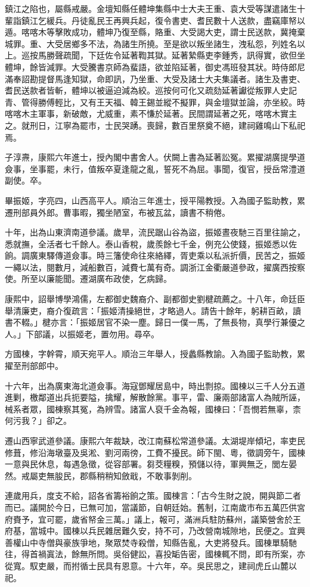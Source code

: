 \begin{pinyinscope}
鎮江之陷也，屬縣戒嚴。金壇知縣任體坤集縣中士大夫王重、袁大受等謀遣諸生十輩詣鎮江乞緩兵。丹徒亂民王再興兵起，復令書吏、耆民數十人送款，盡竊庫帑以遁。喀喀木等擊敗成功，體坤乃復至縣，賂重、大受謁大吏，謂士民送款，冀掩棄城罪。重、大受居鄉多不法，為諸生所撓。至是欲以叛坐諸生，洩私怨，列姓名以上。巡按馬勝聲疏聞，下廷佐令延著鞫其獄。延著縶縣吏李鍾秀，訊得實，欲但坐體坤，餘皆減罪。大受騰書京師為蜚語，欲並陷延著，御史馮班發其狀。時侍郎尼滿奉詔勘提督馬逢知獄，命即訊，乃坐重、大受及諸士大夫集議者。諸生及書吏、耆民送款者皆斬，體坤以被逼迫減為絞。巡按何可化又疏劾延著讞從叛罪人史記青、管得勝傅輕比，又有王天福、韓王錫並縱不擬罪，與金壇獄並論，亦坐絞。時喀喀木主軍事，新破敵，尤威重，素不慊於延著。民間謂延著之死，喀喀木實主之。就刑日，江寧為罷市，士民哭踴。喪歸，數百里祭奠不絕，建祠雞鳴山下私祀焉。

子淳燾，康熙六年進士，授內閣中書舍人。伏闕上書為延著訟冤。累擢湖廣提學道僉事，坐事罷，未行，值叛卒夏逢龍之亂，誓死不為屈。事聞，復官，授岳常澧道副使。卒。

畢振姬，字亮四，山西高平人。順治三年進士，授平陽教授。入為國子監助教，累遷刑部員外郎。曹事暇，獨坐陋室，布被瓦盆，讀書不稍倦。

十年，出為山東濟南道參議。歲旱，流民踞山谷為盜，振姬晝夜馳三百里往諭之，悉就撫，全活者七千餘人。泰山香稅，歲羨餘七千金，例充公使錢，振姬悉以佐餉。調廣東驛傳道僉事。時三籓使命往來絡繹，胥吏乘以私派折價，民苦之，振姬一繩以法，閱數月，減船數百，減費七萬有奇。調浙江金衢嚴道參政，擢廣西按察使。所至以廉能聞。遷湖廣布政使，乞病歸。

康熙中，詔舉博學鴻儒，左都御史魏裔介、副都御史劉楗疏薦之。十八年，命廷臣舉清廉吏，裔介復疏言：「振姬清操絕世，才略過人。請告十餘年，躬耕百畝，讀書不輟。」楗亦言：「振姬居官不染一塵。歸日一僕一馬，了無長物，真學行兼優之人。」下部議，以振姬老，置勿用。尋卒。

方國棟，字幹霄，順天宛平人。順治三年舉人，授蠡縣教諭。入為國子監助教，累擢至刑部郎中。

十六年，出為廣東海北道僉事。海寇鄧耀居島中，時出剽掠。國棟以三千人分五道進剿，檄鄰道出兵扼要隘，擒耀，解散餘黨。事平，雷、廉兩部諸富人為賊所誣，械系者眾，國棟察其冤，為辨雪。諸富人裒千金為報，國棟曰：「吾憫若無辜，柰何污我？」卻之。

遷山西寧武道參議。康熙六年裁缺，改江南蘇松常道參議。太湖堤岸傾圮，率吏民修葺，修沿海墩臺及吳淞、劉河兩徬，工費不擾民。師下閩、粵，徵調旁午，國棟一意與民休息，每遇急徵，從容部署。芻茭糧糗，預儲以待，軍興無乏，閭左晏然。戒屬吏無朘民，郡縣稍稍知斂戢，不敢事剝削。

連歲用兵，度支不給，詔各省籌裕餉之策。國棟言：「古今生財之說，開與節二者而已。議開於今日，已無可加，當議節，自朝廷始。舊制，江南歲市布五萬匹供宮府賚予，宜可罷，歲省帑金三萬。」議上，報可，滿洲兵駐防蘇州，議築營舍於王府基，當城中。國棟以兵民雜居難久安，持不可，乃改營南城隙地，民便之。宜興善權山中寺僧與豪族爭地，聚眾焚寺殺僧，知縣告亂，大吏將發兵。國棟單騎馳往，得首禍寘法，餘無所問。吳俗健訟，喜投缿告密，國棟輒不問，即有所案，亦從寬。馭吏嚴，而拊循士民具有恩意。十六年，卒。吳民思之，建祠虎丘山麓以祀。


\end{pinyinscope}
